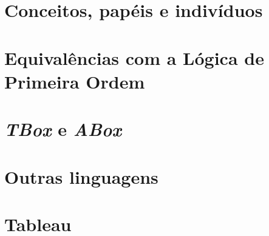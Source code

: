 \section{Conceitos, papéis e indivíduos}

\section{Equivalências com a Lógica de Primeira Ordem}

\section{\textit{TBox} e \textit{ABox}}

\section{Outras linguagens}

\section{Tableau}